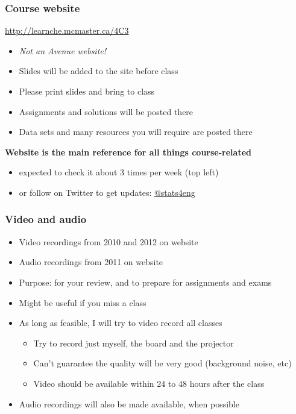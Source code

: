 \begin{frame}\frametitle{Course website}
	
	\begin{exampleblock}{}
		\centering 
		\href{http://learnche.mcmaster.ca/4C3}{http://learnche.mcmaster.ca/4C3}
	\end{exampleblock}
	\begin{itemize}
		\item	\emph{Not an Avenue website!}
		\item	Slides will be added to the site before class
		\item	Please print slides and bring to class
		\item	Assignments and solutions will be posted there
		\item	Data sets and many resources you will require are posted there
	\end{itemize}
	\vspace{12pt}
	\textbf{ Website is the main reference for all things course-related} 
	\begin{itemize}
		\item	expected to check it about 3 times per week {\tiny (top left)}
		\item	or follow on Twitter to get updates: \href{https://twitter.com/stats4eng}{@stats4eng}
	\end{itemize}
\end{frame}

\begin{frame}\frametitle{Video and audio}
	\begin{itemize}
		\item	Video recordings from 2010 and 2012 on website
		\item	Audio recordings from 2011 on website
		\item	Purpose: for your review, and to prepare for assignments and exams 
		\item	Might be useful if you miss a class
		\item	As long as feasible, I will try to video record all classes
		\begin{itemize}
			\item	Try to record just myself, the board and the projector 
			\item	Can't guarantee the quality will be very good (background noise, etc) 
			\item	Video should be available within 24 to 48 hours after the class 
		\end{itemize}
		\item	Audio recordings will also be made available, when possible 
	\end{itemize}
\end{frame}

